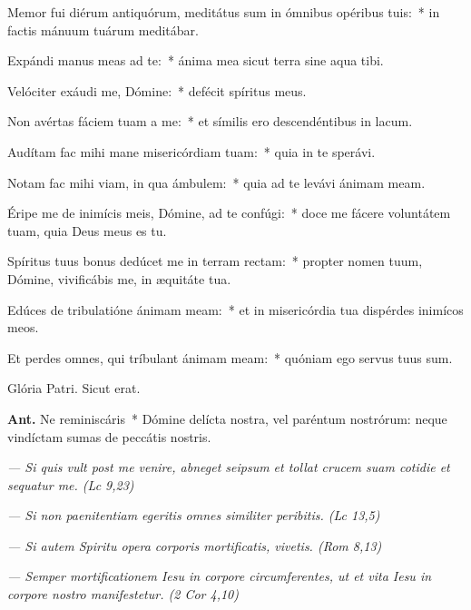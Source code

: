 \documentclass[12pt,a6paper]{book}
\begin{document}
\begin{sloppy}
Memor fui diérum antiquórum, meditátus sum in ómnibus opéribus tuis:~* in factis mánuum tuárum meditábar.

Expándi manus meas ad te:~* ánima mea sicut terra sine aqua tibi.

Velóciter exáudi me, Dómine:~* defécit spíritus meus.

Non avértas fáciem tuam a me:~* et símilis ero descendéntibus in lacum.

Audítam fac mihi mane misericórdiam tuam:~* quia in te sperávi.

Notam fac mihi viam, in qua ámbulem:~* quia ad te levávi ánimam meam.

Éripe me de inimícis meis, Dómine, ad te confúgi:~* doce me fácere voluntátem tuam, quia Deus meus es tu.

Spíritus tuus bonus dedúcet me in terram rectam:~* propter nomen tuum, Dómine, vivificábis me, in æquitáte tua.

Edúces de tribulatióne ánimam meam:~* et in misericórdia tua dispérdes inimícos meos.

Et perdes omnes, qui tríbulant ánimam meam:~* quóniam ego servus tuus sum.

{\small Glória Patri. Sicut erat.}


\textbf{Ant.} Ne reminiscáris~* Dómine delícta nostra, vel paréntum nostrórum: neque vindíctam sumas de peccátis nostris.

\vfill

\textit{— Si quis vult post me venire, abneget seipsum et tollat crucem suam cotidie et sequatur me. (Lc 9,23)}

\textit{— Si non paenitentiam egeritis omnes similiter peribitis. (Lc 13,5)}

\textit{— Si autem Spiritu opera corporis mortificatis, vivetis. (Rom 8,13)}



\textit{— Semper mortificationem Iesu in corpore circumferentes, ut et vita Iesu in corpore nostro manifestetur. (2 Cor 4,10)}



\end{sloppy}
\end{document}

